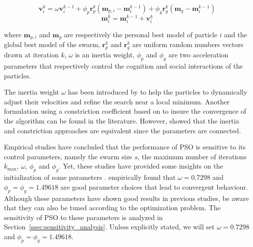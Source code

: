 \begin{equation}
	\mathbf{v}_{i}^{k} = \omega \mathbf{v}_{i}^{k-1} + \phi_{p} \mathbf{r}_{p}^{k} \left( \mathbf{m}_{p,i} - \mathbf{m}_{i}^{k-1} \right) + \phi_{g} \mathbf{r}_{g}^{k} \left( \mathbf{m}_{g} - \mathbf{m}_{i}^{k-1} \right)
	\label{eq:pso_velocity}
\end{equation}
\begin{equation}
	\mathbf{m}_{i}^{k} = \mathbf{m}_{i}^{k-1} + \mathbf{v}_{i}^{k}
	\label{eq:pso_position}
\end{equation}

\noindent where $\mathbf{m}_{p,i}$ and $\mathbf{m}_{g}$ are respectively the personal best model of particle $i$ and the global best model of the swarm, $\mathbf{r}_{p}^{k}$ and $\mathbf{r}_{g}^{k}$ are uniform random numbers vectors drawn at iteration $k$, $\omega$ is an inertia weight, $\phi_{p}$ and $\phi_{g}$ are two acceleration parameters that respectively control the cognition and social interactions of the particles.

The inertia weight $\omega$ has been introduced by \cite{Shi1998} to help the particles to dynamically adjust their velocities and refine the search near a local minimum. Another formulation using a constriction coefficient based on \cite{Clerc1999} to insure the convergence of the algorithm can be found in the literature. However, \cite{Eberhart2000} showed that the inertia and constriction approaches are equivalent since the parameters are connected.

Empirical studies have concluded that the performance of PSO is sensitive to its control parameters, namely the swarm size $s$, the maximum number of iterations $k_{\max}$, $\omega$, $\phi_{p}$ and $\phi_{g}$. Yet, these studies have provided some insights on the initialization of some parameters \citep{VanDenBergh2006}. \cite{Eberhart2000} empirically found that $\omega = 0.7298$ and $\phi_{p} = \phi_{g} = 1.49618$ are good parameter choices that lead to convergent behaviour. Although these parameters have shown good results in previous studies, be aware that they can also be tuned according to the optimization problem. The sensitivity of PSO to these parameters is analyzed in Section~\ref{ssec:sensitivity_analysis}. Unless explicitly stated, we will set $\omega = 0.7298$ and $\phi_{p} = \phi_{g} = 1.49618$.

